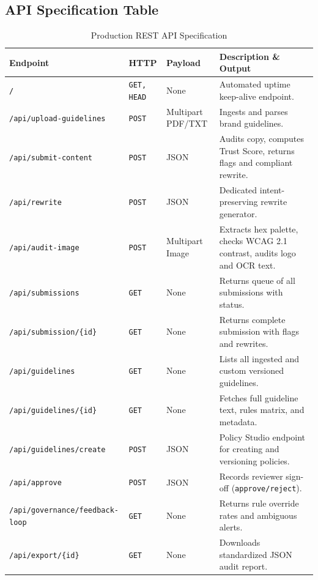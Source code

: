 \documentclass[11pt,a4paper]{article}
\begin{document}
\subsection{API Specification Table}
\begin{table}[H]
\centering
\small
\begin{tabular}{@{}lllp{6cm}@{}}
\toprule
\textbf{Endpoint} & \textbf{HTTP} & \textbf{Payload} & \textbf{Description \& Output} \\
\midrule
\texttt{/} & \texttt{GET, HEAD} & None & Automated uptime keep-alive endpoint. \\
\texttt{/api/upload-guidelines} & \texttt{POST} & Multipart PDF/TXT & Ingests and parses brand guidelines. \\
\texttt{/api/submit-content} & \texttt{POST} & JSON & Audits copy, computes Trust Score, returns flags and compliant rewrite. \\
\texttt{/api/rewrite} & \texttt{POST} & JSON & Dedicated intent-preserving rewrite generator. \\
\texttt{/api/audit-image} & \texttt{POST} & Multipart Image & Extracts hex palette, checks WCAG 2.1 contrast, audits logo and OCR text. \\
\texttt{/api/submissions} & \texttt{GET} & None & Returns queue of all submissions with status. \\
\texttt{/api/submission/\{id\}} & \texttt{GET} & None & Returns complete submission with flags and rewrites. \\
\texttt{/api/guidelines} & \texttt{GET} & None & Lists all ingested and custom versioned guidelines. \\
\texttt{/api/guidelines/\{id\}} & \texttt{GET} & None & Fetches full guideline text, rules matrix, and metadata. \\
\texttt{/api/guidelines/create} & \texttt{POST} & JSON & Policy Studio endpoint for creating and versioning policies. \\
\texttt{/api/approve} & \texttt{POST} & JSON & Records reviewer sign-off (\texttt{approve/reject}). \\
\texttt{/api/governance/feedback-loop} & \texttt{GET} & None & Returns rule override rates and ambiguous alerts. \\
\texttt{/api/export/\{id\}} & \texttt{GET} & None & Downloads standardized JSON audit report. \\
\bottomrule
\end{tabular}
\caption{Production REST API Specification}
\end{table}
\end{document}
